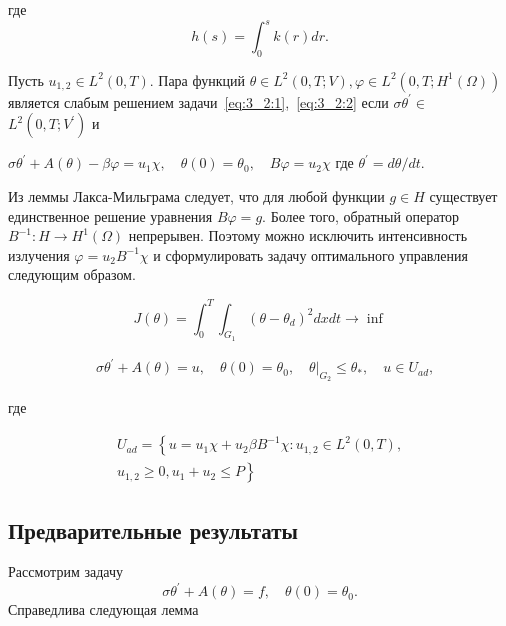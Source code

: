 где
\[
    h(s)=\int_{0}^{s} k(r) d r.
\]

\begin{definition}
    Пусть $u_{1,2} \in L^{2}(0, T)$.
    Пара функций $\theta \in L^{2}(0, T ; V), \varphi \in L^{2}\left(0, T ; H^{1}(\Omega)\right)$
    является слабым решением задачи~\eqref{eq:3_2:1},~\eqref{eq:3_2:2}
    если $\sigma \theta^{\prime} \in$ $L^{2}\left(0, T ; V^{\prime}\right)$ и

    $\sigma \theta^{\prime}+A(\theta)-\beta \varphi=u_{1} \chi, \quad \theta(0)=\theta_{0},
    \quad B \varphi=u_{2} \chi$ где $\theta^{\prime}=d \theta / d t$.
\end{definition}

Из леммы Лакса-Мильграма следует, что для любой функции $g \in H$
существует единственное решение уравнения $B \varphi=g$.
Более того, обратный оператор $B^{-1}: H \rightarrow H^{1}(\Omega)$ непрерывен.
Поэтому можно исключить интенсивность излучения $\varphi=u_{2} B^{-1} \chi$ и
сформулировать задачу оптимального управления следующим образом.

\begin{definition}
[Задача P]
    \label{subsec:ch3:sec2:subsec3:P}
    \[
        J(\theta)=\int_{0}^{T}
        \int_{G_{1}}\left(\theta-\theta_{d}\right)^{2} d x d t \rightarrow \inf
    \]

    \[
        \begin{aligned}
            & \sigma \theta^{\prime}+A(\theta)=u,
            \quad \theta(0)=\theta_{0},\left.\quad
            \theta\right|_{G_{2}} \leq \theta_{*},
            \quad u \in U_{a d},
        \end{aligned}
    \]

    где

    \[
        \begin{array}{r}
            U_{a d}=\left\{u=u_{1} \chi+u_{2} \beta B^{-1}
            \chi: u_{1,2} \in L^{2}(0, T),\right. \\
            \left.u_{1,2} \geq 0, u_{1}+u_{2} \leq P\right\}
        \end{array}
    \]
\end{definition}

\subsection{Предварительные результаты}
\label{subsec:ch3:sec2:subsec4}
Рассмотрим задачу
\begin{equation}
    \label{eq:3_2:3}
    \sigma \theta^{\prime}+A(\theta)=f, \quad \theta(0)=\theta_{0}.
\end{equation}
Справедлива следующая лемма

